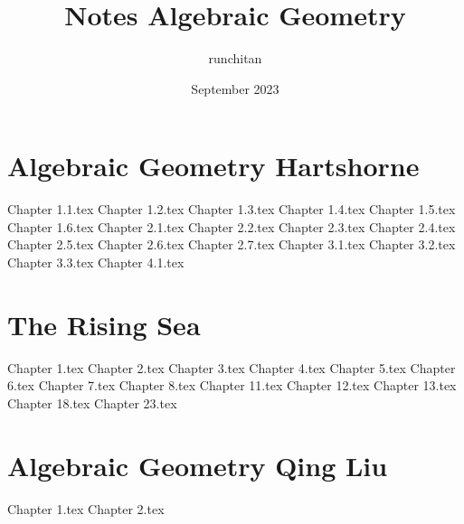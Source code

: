 \documentclass{book}
\title{Notes Algebraic Geometry}
\author{runchitan }
\date{September 2023}
\begin{document}

\tableofcontents

\newpage\part{Algebraic Geometry Hartshorne}
{Chapter 1.1.tex}
{Chapter 1.2.tex}
{Chapter 1.3.tex}
{Chapter 1.4.tex}
{Chapter 1.5.tex}
{Chapter 1.6.tex}
{Chapter 2.1.tex}
{Chapter 2.2.tex}
{Chapter 2.3.tex}
{Chapter 2.4.tex}
{Chapter 2.5.tex}
{Chapter 2.6.tex}
{Chapter 2.7.tex}
{Chapter 3.1.tex}
{Chapter 3.2.tex}
{Chapter 3.3.tex}
{Chapter 4.1.tex}
\newpage\part{The Rising Sea}
{Chapter 1.tex}
{Chapter 2.tex}
{Chapter 3.tex}
{Chapter 4.tex}
{Chapter 5.tex}
{Chapter 6.tex}
{Chapter 7.tex}
{Chapter 8.tex}
{Chapter 11.tex}
{Chapter 12.tex}
{Chapter 13.tex}
{Chapter 18.tex}
{Chapter 23.tex}

\newpage\part{Algebraic Geometry Qing Liu}
{Chapter 1.tex}
{Chapter 2.tex}
\end{document}
